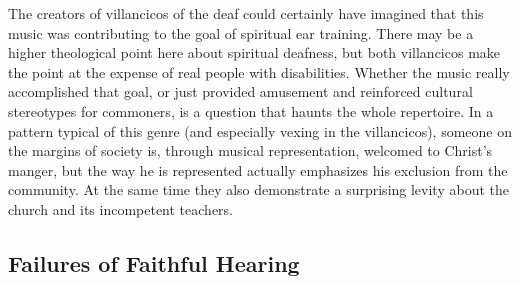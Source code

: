 The creators of villancicos of the deaf could certainly have imagined that this 
music was contributing to the goal of spiritual ear training.
There may be a higher theological point here about spiritual deafness, but both 
 villancicos make the point at the expense of real people with 
disabilities.
Whether the music really accomplished that goal, or just provided amusement and 
reinforced cultural stereotypes for commoners, is a question that haunts the 
whole repertoire.
In a pattern typical of this genre (and especially vexing in the 
 villancicos), someone on the margins of society is, through 
musical representation, welcomed to Christ's manger, but the way he is 
represented actually emphasizes his exclusion from the community.%
    \Autocites{Baker:EthnicVC}{Baker:PerformancePostColonial}
    {Cashner:PadillaRhythm-AMS}
At the same time they also demonstrate a surprising levity about the church and 
its incompetent teachers.


\subsection{Failures of Faithful Hearing}

